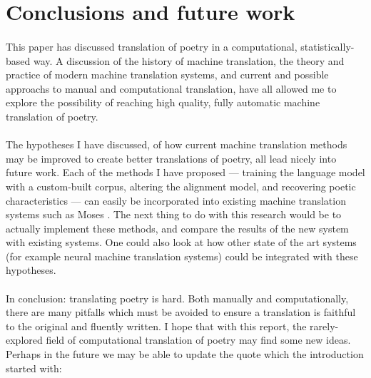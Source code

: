 \section*{Conclusions and future work}

\paragraph{}{This paper has discussed translation of poetry in a
  computational, statistically-based way. A discussion of the history
  of machine translation, the theory and practice of modern machine
  translation systems, and current and possible approachs to manual
  and computational translation, have all allowed me to explore the
  possibility of reaching high quality, fully automatic machine
  translation of poetry. }
\paragraph{}{The hypotheses I have discussed, of how current machine
  translation methods may be improved to create better translations of
  poetry, all lead nicely into future work. Each of the methods I have
  proposed --- training the language model with a custom-built corpus,
  altering the alignment model, and recovering poetic characteristics
  --- can easily be incorporated into existing machine translation
  systems such as Moses \cite{moses}. The next thing to do with this
  research would be to actually implement these methods, and compare
  the results of the new system with existing systems. One could also
  look at how other state of the art systems (for example neural
  machine translation systems) could be integrated with these
  hypotheses. }
\paragraph{}{In conclusion: translating poetry is hard. Both manually
  and computationally, there are many pitfalls which must be avoided
  to ensure a translation is faithful to the original and fluently
  written. I hope that with this report, the rarely-explored field of
  computational translation of poetry may find some new ideas. Perhaps
  in the future we may be able to update the quote which the
  introduction started with:\\}

